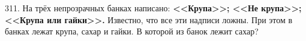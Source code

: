 311. На трёх непрозрачных банках написано: {\bf <<Крупа>>; <<Не крупа>>; <<Крупа или гайки>>.} Известно, что все эти надписи ложны. При этом в банках лежат крупа, сахар и гайки. В которой из банок лежит сахар?\\
